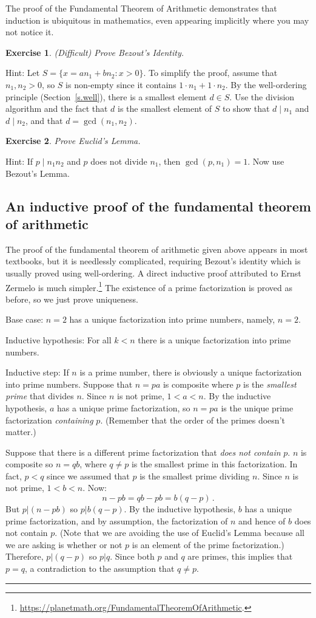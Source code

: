 \documentclass[11pt,a4paper]{report}
\newcommand*{\qed}{\hfill\rule{1ex}{1.5ex}}
\newtheorem{exercise}{Exercise}
\begin{document}
The proof of the Fundamental Theorem of Arithmetic demonstrates that induction is ubiquitous in mathematics, even appearing implicitly where you may not notice it.

\begin{exercise}
(Difficult) Prove Bezout's Identity.
\end{exercise}
Hint: Let $S=\{x = an_1+bn_2: x>0\}$. To simplify the proof, assume that $n_1,n_2>0$, so $S$ is non-empty since it contains $1\cdot n_1+1\cdot n_2$. By the well-ordering principle (Section~\ref{s.well}), there is a smallest element $d\in S$. Use the division algorithm and the fact that $d$ is the smallest element of $S$ to show that $d\mid n_1$ and $d\mid n_2$, and that $d=\gcd(n_1,n_2)$.

\begin{exercise}
Prove Euclid's Lemma.
\end{exercise}
Hint: If $p\mid n_1n_2$ and $p$ does not divide $n_1$, then $\gcd(p,n_1)=1$. Now use Bezout's Lemma.

\subsection*{An inductive proof of the fundamental theorem of arithmetic}

The proof of the fundamental theorem of arithmetic given above appears in most textbooks, but it is needlessly complicated, requiring Bezout's identity which is usually proved using well-ordering. A direct inductive proof attributed to Ernst Zermelo is much simpler.\footnote{\url{https://planetmath.org/FundamentalTheoremOfArithmetic}.} The existence of a prime factorization is proved as before, so we just prove uniqueness.

Base case: $n=2$ has a unique factorization into prime numbers, namely, $n=2$. 

Inductive hypothesis: For all $k<n$ there is a unique factorization into prime numbers.

Inductive step: If $n$ is a prime number, there is obviously a unique factorization into prime numbers. Suppose that $n=pa$ is composite where $p$ is the \emph{smallest prime} that divides $n$. Since $n$ is not prime, $1<a<n$. By the inductive hypothesis, $a$ has a unique prime factorization, so $n=pa$ is the unique prime factorization \emph{containing} $p$. (Remember that the order of the primes doesn't matter.)

Suppose that there is a different prime factorization that \emph{does not contain} $p$. $n$ is composite so $n=qb$, where $q\neq p$ is the smallest prime in this factorization. In fact, $p<q$ since we assumed that $p$ is the smallest prime dividing $n$. Since $n$ is not prime, $1<b<n$. Now:
\[
n - pb = qb - pb = b(q-p)\,.
\]
But $p|(n-pb)$ so $p|b(q-p)$. By the inductive hypothesis, $b$ has a unique prime factorization, and by assumption, the factorization of $n$ and hence of $b$ does not contain $p$. (Note that we are avoiding the use of Euclid's Lemma because all we are asking is whether or not $p$ is an element of the prime factorization.) Therefore, $p|(q-p)$ so $p|q$. Since both $p$ and $q$ are primes, this implies that $p=q$, a contradiction to the assumption that $q\neq p$.\qed
\end{document}
